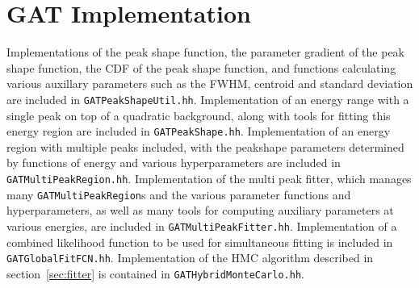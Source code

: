 \documentclass[/main.tex]{subfiles}
\begin{document}
\section{GAT Implementation}
Implementations of the peak shape function, the parameter gradient of the peak shape function, the CDF of the peak shape function, and functions calculating various auxillary parameters such as the FWHM, centroid and standard deviation are included in \texttt{GATPeakShapeUtil.hh}.
Implementation of an energy range with a single peak on top of a quadratic background, along with tools for fitting this energy region are included in \texttt{GATPeakShape.hh}.
Implementation of an energy region with multiple peaks included, with the peakshape parameters determined by functions of energy and various hyperparameters are included in \texttt{GATMultiPeakRegion.hh}.
Implementation of the multi peak fitter, which manages many \texttt{GATMultiPeakRegion}s and the various parameter functions and hyperparameters, as well as many tools for computing auxiliary parameters at various energies, are included in \texttt{GATMultiPeakFitter.hh}.
Implementation of a combined likelihood function to be used for simultaneous fitting is included in \texttt{GATGlobalFitFCN.hh}.
Implementation of the HMC algorithm described in section~\ref{sec:fitter} is contained in \texttt{GATHybridMonteCarlo.hh}.
\\
\end{document}
